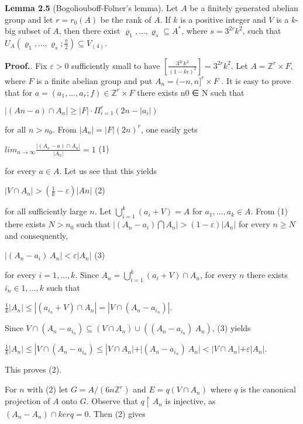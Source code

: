 \documentclass[12pt]{article}
\begin{document}
    \textbf{Lemma 2.5} (Bogoliouboff-Folner's lemma). Let $A$ be a finitely generated abelian group and let $r = r_0 (A)$ be the rank of $A$. If $k$ is
    a positive integer and $V$ is a $k$-big subset of $A$, then there exist $\varrho_1,...,\varrho_s \subseteq A^*$, where $s = 3^{2r} k^2$, such that $U_A (\varrho_1,...,\varrho_s; \frac{\pi}{2}) \subseteq V_{(4)}$.


    \textbf{Proof.}. Fix $\varepsilon > 0$ sufficiently small to have $[\frac{3^{2r} k^2}{(1-k \epsilon)^2}] = 3^{2r} k^2$. Let $A = \mathbb{Z}^r \times F$, where $F$ is a finite abelian group and put
    $A_n = (-n,n]^r \times F$ . It is easy to prove that for $a = (a_1,...,a_r; f ) \in \mathbb{Z}^r \times F$ there exists n0 ∈ N such that

    
        $|(An - a) \cap A_n| \geqslant  |F| \cdot \Pi^r_{i=1} (2n - |a_i|)$ 


    for all $n > n_0$. From $|A_n|=|F|(2n)^r$, one easily gets


        $lim_{n \to \infty} \frac{|(A_n - a) \cap A_n|}{|A_n|} = 1 $  (1)


    for every $a ∈ A$. Let us see that this yields


        $|V \cap A_n| > (\frac{1}{k} - \varepsilon)|An|$  (2)


    for all sufficiently large $n$. Let $\bigcup^{k}_{i=1} (a_i + V) = A$ for $a_1,...,a_k \in A$. From (1) there exists $N > n_0$ such that
    $|(A_n - a_i) \bigcap A_n| > (1 - \varepsilon)|A_n|$ for every $n \geqslant N$ and consequently,


        $|(A_n - a_i) \ A_n| < \varepsilon|A_n|$  (3)


    for every $i = 1,...,k$. Since $A_n = \bigcup^k_{i=1}(a_i + V ) \cap A_n$, for every $n$ there exists $i_n \in {1,...,k}$ such that


        $\frac{1}{k}|A_n| \leqslant |(a_{i_n} + V ) \cap A_n| = |V \cap (A_n - a_{i_n})|$.


    Since $V \cap (A_n - a_{i_n} ) \subseteq (V \cap A_n) \cup ((A_n - a_{i_n} ) \ A_n)$, (3) yields


        $\frac{1}{k}|A_n| \leqslant | V \cap (A_n - a_{i_n} ) \leqslant |V \cap A_n| + |(A_n - a_{i_n} ) \ A_n | < |V \cap A_n| + \varepsilon|A_n|.$


    This proves (2).


        For $n$ with (2) let $G = A/(6n \mathbb{Z}^r)$ and $E = q(V \cap A_n)$ where $q$ is the canonical projection of $A$ onto $G$. Observe that $q  \upharpoonright {A_n}$
    is injective, as $(A_n - A_n) \cap ker q = {0}$. Then (2) gives
\end{document}

